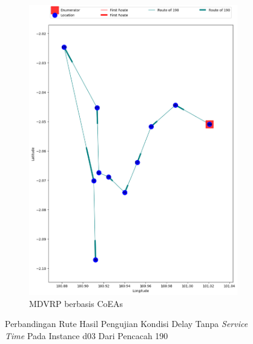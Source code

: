 \begin{figure}[H]
	\centering
	\begin{subfigure}[t]{\textwidth}
		\centering
		\includegraphics[width=\textwidth]{Resources/Images/delayed_3/real_m15_n100_delayed_3_190_coes}
		\caption{MDVRP berbasis CoEAs}
		\label{fig:real_m15_n100_delayed_3_190_coes}
	\end{subfigure}
	\caption{Perbandingan Rute Hasil Pengujian Kondisi Delay Tanpa \textit{Service Time} Pada Instance d03 Dari Pencacah 190}
	\label{fig:real_m15_n100_delayed_3_190}
\end{figure}


